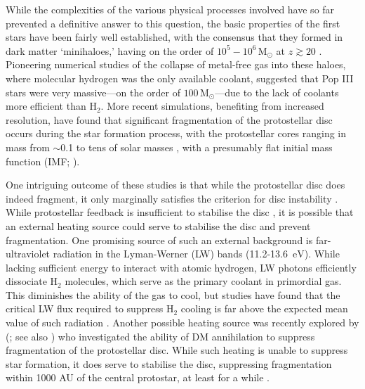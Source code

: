 \documentclass{thesis}
\newcommand{\msun}{\ensuremath{\,\mathrm{M}_{\odot}}\xspace}
\newcommand{\ev}{\ensuremath{\,\mathrm{eV}}\xspace}
\newcommand{\htwo}{\ensuremath{\mathrm{H}_2}\xspace}
\newcommand{\about}{\ensuremath{\sim}}
\begin{document}
While the complexities of the various physical processes involved have so far prevented a definitive answer to this question, the basic properties of the first stars have been fairly well established, with the consensus that they formed in dark matter `minihaloes,' having on the order of $10^5 - 10^6 \msun$ at $z\gtrsim 20$ \citep{CouchmanRees1986, HaimanThoulLoeb1996, Tegmarketal1997}.  Pioneering numerical studies of the collapse of metal-free gas into these haloes, where molecular hydrogen was the only available coolant, suggested that Pop III stars were very massive---on the order of $100\msun$---due to the lack of coolants more efficient than \htwo \citep[e.g.,][]{BrommCoppiLarson1999, BrommCoppiLarson2002, AbelBryanNorman2002, Yoshidaetal2003, BrommLarson2004, Yoshidaetal2006, O'SheaNorman2007}.  More recent simulations, benefiting from increased resolution, have found that significant fragmentation of the protostellar disc occurs during the star formation process, with the protostellar cores ranging in mass from \about0.1 to tens of solar masses \citep{StacyGreifBromm2010, Clarketal2011a, Clarketal2011b, Greifetal2011, Greifetal2012, StacyBromm2013, SusaHasegawaTominaga2014, Hiranoetal2014,Hiranoetal2015}, with a presumably flat initial mass function (IMF; \citealt{Dopckeetal2013}).

One intriguing outcome of these studies is that while the protostellar disc does indeed fragment, it only marginally satisfies the \citet{Gammie2001} criterion for disc instability \citep{Clarketal2011b, Greifetal2011, Greifetal2012}. While protostellar feedback is insufficient to stabilise the disc \citep{Smithetal2011, StacyGreifBromm2012}, it is possible that an external heating source could serve to stabilise the disc and prevent fragmentation. One promising source of such an external background is far-ultraviolet radiation in the Lyman-Werner (LW) bands (11.2-13.6 \ev).  While lacking sufficient energy to interact with atomic hydrogen, LW photons efficiently dissociate \htwo molecules, which serve as the primary coolant in primordial gas.  This diminishes the ability of the gas to cool, but studies have found that the critical LW flux required to suppress \htwo cooling is far above the expected mean value of such radiation \citep{Dijkstraetal2008}. Another possible heating source was recently explored by \citeauthor{Smithetal2012b}  (\citeyear{Smithetal2012b}; see also \citealt{Ripamontietal2009, Ripamontietal2010}) who investigated the ability of DM annihilation  to suppress fragmentation of the protostellar disc.  While such heating is unable to suppress star formation, it does serve to stabilise the disc, suppressing fragmentation within 1000 AU of the central protostar, at least for a while \citep{Stacyetal2012, Stacyetal2014}.
\end{document}
